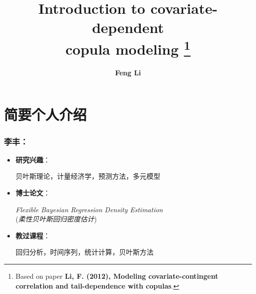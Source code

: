 \documentclass[14pt]{beamer}
\title[Covariate-dependent copulas]{{\textbf{Introduction to
      covariate-dependent\\ copula modeling
\footnote{\tiny{Based on paper \textbf{Li, F. (2012), Modeling covariate-contingent correlation and tail-dependence with copulas}.}}
}}}
\author[Feng Li]{\textbf{Feng Li}}
\institute[Stockholm University]{\textbf{Department of
    Statistics, Stockholm University}}
\date{\color{SUblue}{ \textbf{March, 2013}}}
\begin{document}


\section*{简要个人介绍}
\begin{frame}[plain]
  \frametitle{李丰：\color{violet}{瑞典斯德哥尔摩大学统计系}}
  \addtocounter{framenumber}{-2}

  \begin{itemize}
  \item [] \textbf{研究兴趣}：

    贝叶斯理论，计量经济学，预测方法，多元模型

  \item [] \textbf{博士论文}：

    \emph{Flexible Bayesian Regression Density Estimation}\\
    (\emph{柔性贝叶斯回归密度估计})

  \item [] \textbf{教过课程}：

    回归分析，时间序列，统计计算，贝叶斯方法
  \end{itemize}

\end{frame}

\begin{frame}[plain]
  \addtocounter{framenumber}{0}
  \titlepage
\end{frame}


\end{document}
